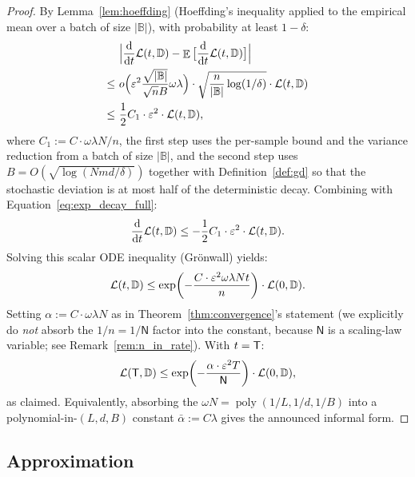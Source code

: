 \documentclass[11pt]{article}
\theoremstyle{plain}
\renewcommand{\d}{\mathrm{d}}
\DeclareMathOperator*{\E}{{\mathbb{E}}}
\DeclareMathOperator{\poly}{poly}
\begin{document}
\begin{proof}
    By Lemma~\ref{lem:hoeffding} (Hoeffding's inequality applied to the empirical mean over a batch of size $|\mathbb{B}|$), with probability at least $1-\delta$:
    \begin{align*}
        & ~ \Big| \frac{\d }{\d t} {\cal L}(t, \mathbb{D}) - \E\big[\frac{\d }{\d t} {\cal L}(t, \mathbb{D})\big] \Big| \\
        \leq & ~  o\Big(\varepsilon^2\frac{\sqrt{|\mathbb{B}|}}{\sqrt{n}B} \omega \lambda \Big) \cdot \sqrt{\frac{n}{|\mathbb{B}|} \log(1/\delta)}\cdot {\cal L}(t, \mathbb{D}) \\
        \leq & ~  \frac{1}{2}C_1\cdot \varepsilon^2\cdot {\cal L}(t, \mathbb{D}),
    \end{align*}
    where $C_1 := C\cdot \omega\lambda N/n$, the first step uses the per-sample bound and the variance reduction from a batch of size $|\mathbb{B}|$, and the second step uses $B = O(\sqrt{\log(Nmd/\delta)})$ together with Definition~\ref{def:gd} so that the stochastic deviation is at most half of the deterministic decay. Combining with Equation~\eqref{eq:exp_decay_full}:
    \begin{align*}
        \frac{\d }{\d t} {\cal L}(t, \mathbb{D}) \leq -\frac{1}{2}C_1\cdot \varepsilon^2 \cdot {\cal L}(t, \mathbb{D}).
    \end{align*}
    Solving this scalar ODE inequality (Grönwall) yields:
    \begin{align*}
        {\cal L}(t, \mathbb{D}) \leq \exp\!\left(- \frac{C\cdot \varepsilon^2  \omega\lambda Nt}{n}\right) \cdot {\cal L}(0, \mathbb{D}).
    \end{align*}
    Setting $\alpha := C\cdot \omega\lambda N$ as in Theorem~\ref{thm:convergence}'s statement (we explicitly do {\it not} absorb the $1/n = 1/\mathsf{N}$ factor into the constant, because $\mathsf{N}$ is a scaling-law variable; see Remark~\ref{rem:n_in_rate}). With $t = {\sf T}$:
    \begin{align*}
        {\cal L}({\sf T}, \mathbb{D}) \leq  \exp\!\left(- \frac{\alpha \cdot \varepsilon^2  T}{\mathsf{N}}\right) \cdot {\cal L}(0, \mathbb{D}),
    \end{align*}
    as claimed. Equivalently, absorbing the $\omega N = \poly(1/L,1/d,1/B)$ into a polynomial-in-$(L,d,B)$ constant $\bar\alpha := C\lambda$ gives the announced informal form.
\end{proof}

\subsection{Approximation}\label{app_sub:approximation}
\end{document}
